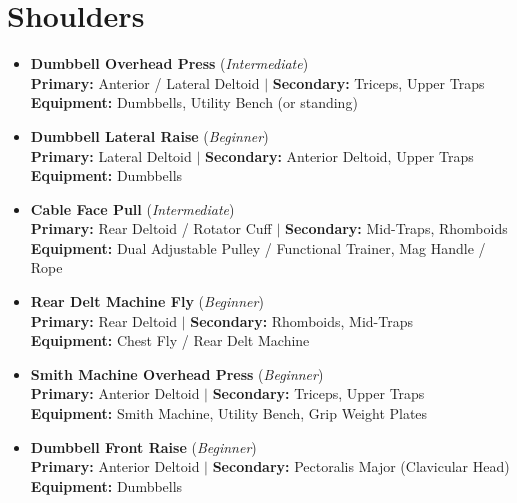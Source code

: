 \documentclass[11pt,a4paper]{article}
\begin{document}
\section*{Shoulders}
\begin{itemize}[leftmargin=*]
  \item \textbf{Dumbbell Overhead Press} (\textit{Intermediate})\\
        \textbf{Primary:} Anterior / Lateral Deltoid $|$ \textbf{Secondary:} Triceps, Upper Traps\\
        \textbf{Equipment:} Dumbbells, Utility Bench (or standing)
  \item \textbf{Dumbbell Lateral Raise} (\textit{Beginner})\\
        \textbf{Primary:} Lateral Deltoid $|$ \textbf{Secondary:} Anterior Deltoid, Upper Traps\\
        \textbf{Equipment:} Dumbbells
  \item \textbf{Cable Face Pull} (\textit{Intermediate})\\
        \textbf{Primary:} Rear Deltoid / Rotator Cuff $|$ \textbf{Secondary:} Mid-Traps, Rhomboids\\
        \textbf{Equipment:} Dual Adjustable Pulley / Functional Trainer, Mag Handle / Rope
  \item \textbf{Rear Delt Machine Fly} (\textit{Beginner})\\
        \textbf{Primary:} Rear Deltoid $|$ \textbf{Secondary:} Rhomboids, Mid-Traps\\
        \textbf{Equipment:} Chest Fly / Rear Delt Machine
  \item \textbf{Smith Machine Overhead Press} (\textit{Beginner})\\
        \textbf{Primary:} Anterior Deltoid $|$ \textbf{Secondary:} Triceps, Upper Traps\\
        \textbf{Equipment:} Smith Machine, Utility Bench, Grip Weight Plates
  \item \textbf{Dumbbell Front Raise} (\textit{Beginner})\\
        \textbf{Primary:} Anterior Deltoid $|$ \textbf{Secondary:} Pectoralis Major (Clavicular Head)\\
        \textbf{Equipment:} Dumbbells
\end{itemize}
\vspace{0.5em}
\end{document}
